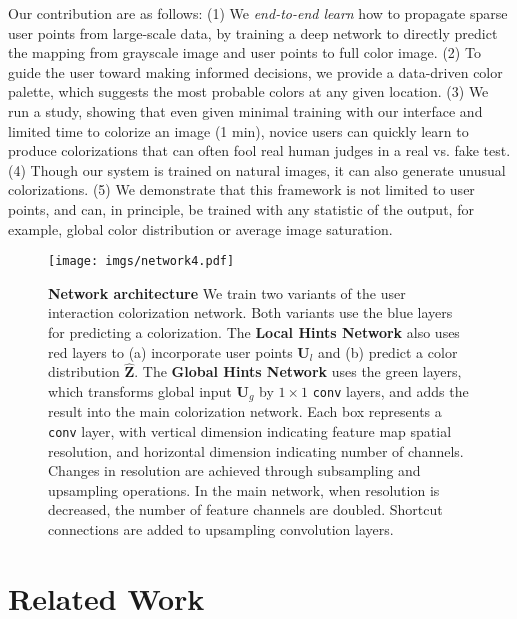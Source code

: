 \documentclass[acmtog,authorversion]{acmart}
\begin{document}
Our contribution are as follows: (1) We \textit{end-to-end learn} how to propagate sparse user points from large-scale data, by training a deep network to directly predict the mapping from grayscale image and user points to full color image. (2) To guide the user toward making informed decisions, we provide a data-driven color palette, which suggests the most probable colors at any given location. (3) We run a study, showing that even given minimal training with our interface and limited time to colorize an image (1 min), novice users can quickly learn to produce colorizations that can often fool real human judges in a real vs. fake test. (4) Though our system is trained on natural images, it can also generate unusual colorizations. (5) We demonstrate that this framework is not limited to user points, and can, in principle, be trained with any statistic of the output, for example, global color distribution or average image saturation.
 \begin{figure*}[t!]
\centering
\texttt{[image: imgs/network4.pdf]}
\vspace{-5mm}
\caption{\textbf{Network architecture} We train two variants of the user interaction colorization network. Both variants use the blue layers for predicting a colorization. The \textbf{Local Hints Network} also uses red layers to (a) incorporate user points $\mathbf{U}_l$ and (b) predict a color distribution $\mathbf{\widehat{Z}}$. The \textbf{Global Hints Network} uses the green layers, which transforms global input $\mathbf{U}_g$ by $1\times 1$ \texttt{conv} layers, and adds the result into the main colorization network. Each box represents a \texttt{conv} layer, with vertical dimension indicating feature map spatial resolution, and horizontal dimension indicating number of channels. Changes in resolution are achieved through subsampling and upsampling operations. In the main network, when resolution is decreased, the number of feature channels are doubled. Shortcut connections are added to upsampling convolution layers.}
\label{fig:network}
\vspace{-2mm}
\end{figure*}

\section{Related Work}
\end{document}
